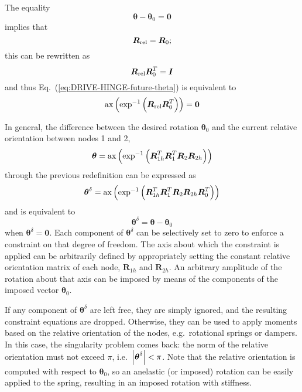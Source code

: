 \documentclass[10pt,dvips,fleqn]{report}
\newcommand{\T}[1]{\boldsymbol{#1}}
\begin{document}
The equality
\begin{equation}
	\T{\theta} - \T{\theta}_0 = \T{0}
	\label{eq:DRIVE-HINGE-future-theta}
\end{equation}
implies that
\begin{equation}
	\T{R}_{\text{\text{rel}}} = \T{R}_0 ;
\end{equation}
this can be rewritten as
\begin{equation}
	\T{R}_{\text{\text{rel}}} \T{R}_0^T = \T{I}
\end{equation}
and thus Eq.~(\ref{eq:DRIVE-HINGE-future-theta})
is equivalent to
\begin{equation}
	\llk{ax}\plbr{\exp^{-1}\plbr{\T{R}_{\text{rel}} \T{R}_0^T}} = \T{0}
\end{equation}

\noindent
In general, the difference between the desired rotation
$\T{\theta}_0$ and the current relative orientation between
nodes 1 and 2,
\begin{equation}
	\T{\theta} = \llk{ax}\plbr{\exp^{-1}\plbr{
		\T{R}_{1h}^T \T{R}_1^T \T{R}_2 \T{R}_{2h}
	}}
	\label{eq:DRIVE-HINGE-future-thetadelta}
\end{equation}
through the previous redefinition can be expressed as
\begin{equation}
	\T{\theta}^{\delta} = \llk{ax}\plbr{\exp^{-1}\plbr{
		\T{R}_{1h}^T \T{R}_1^T \T{R}_2 \T{R}_{2h} \T{R}_0^T
	}}
\end{equation}
and is equivalent to
\begin{equation}
	\T{\theta}^{\delta} = \T{\theta} - \T{\theta}_0
\end{equation}
when $\T{\theta}^{\delta}=\T{0}$.
Each component of $\T{\theta}^{\delta}$ can be selectively set
to zero to enforce a constraint on that degree of freedom.
The axis about which the constraint is applied can be arbitrarily 
defined by appropriately setting the constant relative orientation
matrix of each node, $\T{R}_{1h}$ and $\T{R}_{2h}$.
An arbitrary amplitude of the rotation about that axis can be imposed
by means of the components of the imposed vector $\T{\theta}_0$.

\noindent
If any component of $\T{\theta}^{\delta}$ are left free, they are
simply ignored, and the resulting constraint equations are dropped.
Otherwise, they can be used to apply moments based on the 
relative orientation of the nodes, e.g.\ rotational springs or 
dampers.
In this case, the singularity problem comes back: the norm
of the relative orientation must not exceed $\pi$, i.e.\
$\shbr{\T{\theta}^{\delta}}<\pi$.
Note that the relative orientation is computed with respect to 
$\T{\theta}_0$, so an anelastic (or imposed) rotation can be easily
applied to the spring, resulting in an imposed rotation with stiffness.
\end{document}
